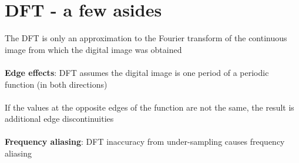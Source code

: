 \documentclass{article}[18pt]
\begin{document}
\section{DFT - a few asides}
The DFT is only an approximation to the Fourier transform of the continuous image from which the digital image was obtained\\
\\
\textbf{Edge effects}: DFT assumes the digital image is one period of a periodic function (in both directions)\\
\\
If the values at the opposite edges of the function are not the same, the result is additional edge discontinuities\\
\\
\textbf{Frequency aliasing}: DFT inaccuracy from under-sampling causes frequency aliasing 
\end{document}
